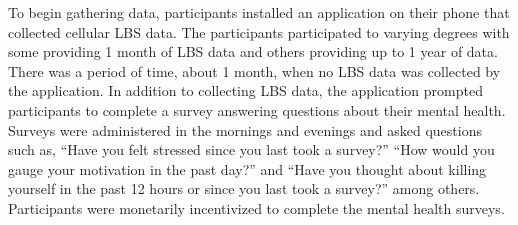 \documentclass[
  letterpaper,
  number,
  review,
  3p]{elsarticle}
\begin{document}
\begin{table}

\caption{\label{tbl-descriptivestats}Descriptive Statistics by Group:
Age, IQ Score, Sex, and Race}


\end{table}%

To begin gathering data, participants installed an application on their
phone that collected cellular LBS data. The participants participated to
varying degrees with some providing 1 month of LBS data and others
providing up to 1 year of data. There was a period of time, about 1
month, when no LBS data was collected by the application. In addition to
collecting LBS data, the application prompted participants to complete a
survey answering questions about their mental health. Surveys were
administered in the mornings and evenings and asked questions such as,
``Have you felt stressed since you last took a survey?'' ``How would you
gauge your motivation in the past day?'' and ``Have you thought about
killing yourself in the past 12 hours or since you last took a survey?''
among others. Participants were monetarily incentivized to complete the
mental health surveys.
\end{document}
